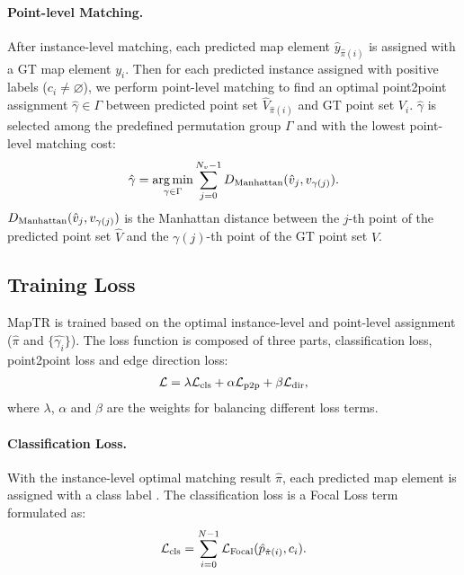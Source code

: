 \documentclass{article} \usepackage{iclr2023_conference,times}
\DeclareMathOperator*{\argmin}{arg\,min}
\newcommand{\oldnew}[2]{#2}
\begin{document}
\paragraph{Point-level Matching.}
After instance-level matching,  each predicted map element $\hat{y}_{\hat{\pi}(i)}$  is assigned with a GT map element $y_i$.
Then for each predicted instance assigned with positive labels ($c_i\neq\varnothing$), we perform point-level matching
to find an optimal point2point assignment $\hat{\gamma} \in \Gamma$ between predicted point set $\hat{V}_{\hat{\pi}(i)}$ and GT point set $V_{i}$. $\hat{\gamma}$ is selected among the predefined permutation group ${\Gamma}$ and with the lowest point-level matching cost:
\begin{equation}
\begin{gathered}
\hat{\gamma} = \argmin_{\gamma \in {\Gamma}} \sum_{j=0}^{N_v-1} 
D_{\rm{Manhattan}}(\hat{v}_{j}, v_{ \gamma(j)}). \label{eq:argmin_pts_loss}
\end{gathered}
\end{equation}
$D_{\rm{Manhattan}}(\hat{v}_{j}, v_{ \gamma(j)})$ is the Manhattan distance between the $j$-th point of the predicted point set $\hat{V}$ and the $\gamma(j)$-th point of the GT point set $V$. 


\subsection{Training Loss
\label{sec:e2e-training}} 
MapTR is trained based on the optimal instance-level and point-level assignment ($\hat{\pi}$ and $\{\hat{\gamma_i}\}$).
The loss function is composed of three parts, classification loss, point2point loss and edge direction loss:
\begin{equation}
\begin{gathered}
   \mathcal{L} = \lambda \mathcal{L}_{\rm{cls}} + \alpha \mathcal{L}_{\rm{p2p}} + \beta \mathcal{L}_{\rm{dir}},
\end{gathered}    
\end{equation}
where $\lambda$, $\alpha$ and $\beta$ are the weights for balancing different loss terms.


\paragraph{Classification Loss.}
With  the  instance-level  optimal matching result $\hat{\pi}$,
each predicted map element is assigned with a class label \oldnew{(or 'no object' $\varnothing$)}{}. The classification loss is a Focal Loss term formulated as:
\begin{equation}
\begin{gathered}
\mathcal{L}_{\rm{cls}} = \sum_{i=0}^{N-1} \mathcal{L}_{\rm{Focal}}(\hat{p}_{\hat{\pi}(i)}, c_i).
\end{gathered}
\end{equation}
\end{document}
